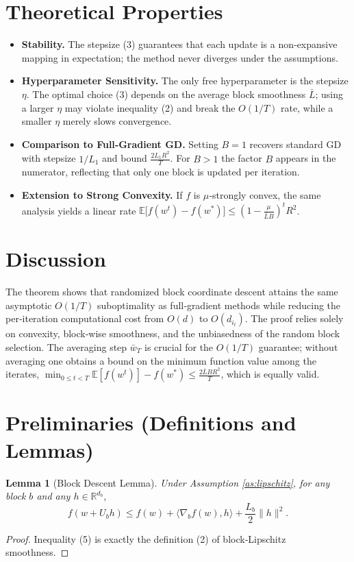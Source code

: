 \documentclass{article}
\newtheorem{lemma}{Lemma}
\newcommand{\E}{\mathbb{E}}
\begin{document}
\section*{Theoretical Properties}
\begin{itemize}
\item \textbf{Stability.} The stepsize (3) guarantees that each update is a
non‑expansive mapping in expectation; the method never diverges under the
assumptions.
\item \textbf{Hyperparameter Sensitivity.} The only free hyperparameter is the
stepsize $\eta$. The optimal choice (3) depends on the average block smoothness
$\bar L$; using a larger $\eta$ may violate inequality (2) and break the $O(1/T)$
rate, while a smaller $\eta$ merely slows convergence.
\item \textbf{Comparison to Full‑Gradient GD.} Setting $B=1$ recovers standard GD
with stepsize $1/L_{1}$ and bound $\frac{2L_{1}R^{2}}{T}$. For $B>1$ the factor
$B$ appears in the numerator, reflecting that only one block is updated per
iteration.
\item \textbf{Extension to Strong Convexity.} If $f$ is $\mu$‑strongly convex,
the same analysis yields a linear rate
$\E\!\bigl[f(w^{t})-f(w^{*})\bigr]\le (1-\frac{\mu}{\bar L B})^{t}R^{2}$.
\end{itemize}

\section*{Discussion}
The theorem shows that randomized block coordinate descent attains the same
asymptotic $O(1/T)$ suboptimality as full‑gradient methods while reducing the per‑iteration
computational cost from $O(d)$ to $O(d_{i_{t}})$. The proof relies solely on convexity,
block‑wise smoothness, and the unbiasedness of the random block selection. The
averaging step $\bar w_{T}$ is crucial for the $O(1/T)$ guarantee; without averaging
one obtains a bound on the minimum function value among the iterates,
$\min_{0\le t<T} \E[f(w^{t})]-f(w^{*})\le \frac{2\bar L B R^{2}}{T}$, which is equally valid.

\newpage
\section*{Preliminaries (Definitions and Lemmas)}
\begin{lemma}[Block Descent Lemma]\label{lem:descent}
Under Assumption \ref{as:lipschitz}, for any block $b$ and any $h\in\mathbb{R}^{d_{b}}$,
\[
f(w+U_{b}h)\le f(w)+\langle\nabla_{b}f(w),h\rangle+\frac{L_{b}}{2}\|h\|^{2}.
\tag{5}
\]
\end{lemma}
\begin{proof}
Inequality (5) is exactly the definition (2) of block‑Lipschitz smoothness. \qedhere
\end{proof}
\end{document}
